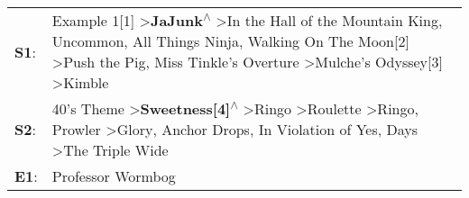 \begin{supertabular}{p{0.03\textwidth}p{0.92\textwidth}}
 \textbf{S1}:  &  Example 1[1]\textsuperscript{} \textgreater \enspace \textbf{JaJunk\textsuperscript{$\wedge$}} \textgreater \enspace In the Hall of the Mountain King\textsuperscript{}, \enspace Uncommon\textsuperscript{}, \enspace All Things Ninja\textsuperscript{}, \enspace Walking On The Moon[2]\textsuperscript{} \textgreater \enspace Push the Pig\textsuperscript{}, \enspace Miss Tinkle's Overture\textsuperscript{} \textgreater \enspace Mulche's Odyssey[3]\textsuperscript{} \textgreater \enspace Kimble\textsuperscript{}  \enspace  \\
 \textbf{S2}:  &           40's Theme\textsuperscript{} \textgreater \enspace \textbf{Sweetness[4]\textsuperscript{$\wedge$}} \textgreater \enspace Ringo\textsuperscript{} \textgreater \enspace Roulette\textsuperscript{} \textgreater \enspace Ringo\textsuperscript{}, \enspace Prowler\textsuperscript{} \textgreater \enspace Glory\textsuperscript{}, \enspace Anchor Drops\textsuperscript{}, \enspace In Violation of Yes\textsuperscript{},  Days\textsuperscript{} \textgreater \enspace The Triple Wide\textsuperscript{}  \enspace  \\
 \textbf{E1}:  &                                                                                                                                                                                                                                                                                                                                                                                                                                                                                              Professor Wormbog\textsuperscript{}  \enspace  \\
\end{supertabular}

